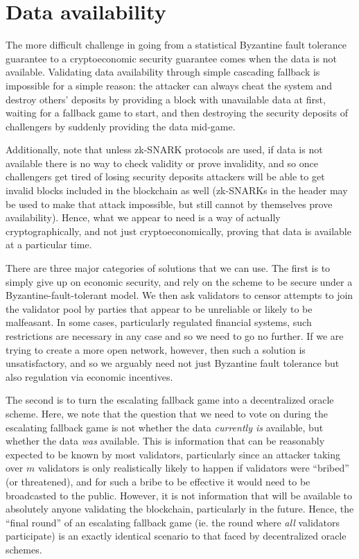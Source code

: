 \documentclass[11pt,a4paper]{report}
\theoremstyle{plain}
\theoremstyle{definition}
\theoremstyle{remark}
\begin{document}
\chapter{Data availability}

The more difficult challenge in going from a statistical Byzantine fault tolerance guarantee to a cryptoeconomic security guarantee comes when the data is not available. Validating data availability through simple cascading fallback is impossible for a simple reason: the attacker can always cheat the system and destroy others' deposits by providing a block with unavailable data at first, waiting for a fallback game to start, and then destroying the security deposits of challengers by suddenly providing the data mid-game.

Additionally, note that unless zk-SNARK protocols are used, if data is not available there is no way to check validity or prove invalidity, and so once challengers get tired of losing security deposits attackers will be able to get invalid blocks included in the blockchain as well (zk-SNARKs in the header may be used to make that attack impossible, but still cannot by themselves prove availability). Hence, what we appear to need is a way of actually cryptographically, and not just cryptoeconomically, proving that data is available at a particular time.

There are three major categories of solutions that we can use. The first is to simply give up on economic security, and rely on the scheme to be secure under a Byzantine-fault-tolerant model. We then ask validators to censor attempts to join the validator pool by parties that appear to be unreliable or likely to be malfeasant. In some cases, particularly regulated financial systems, such restrictions are necessary in any case and so we need to go no further. If we are trying to create a more open network, however, then such a solution is unsatisfactory, and so we arguably need not just Byzantine fault tolerance but also regulation via economic incentives.

The second is to turn the escalating fallback game into a decentralized oracle scheme. Here, we note that the question that we need to vote on during the escalating fallback game is not whether the data \emph{currently is} available, but whether the data \emph{was} available. This is information that can be reasonably expected to be known by most validators, particularly since an attacker taking over $m$ validators is only realistically likely to happen if validators were ``bribed'' (or threatened), and for such a bribe to be effective it would need to be broadcasted to the public. However, it is not information that will be available to absolutely anyone validating the blockchain, particularly in the future. Hence, the ``final round'' of an escalating fallback game (ie. the round where \emph{all} validators participate) is an exactly identical scenario to that faced by decentralized oracle schemes.
\end{document}
